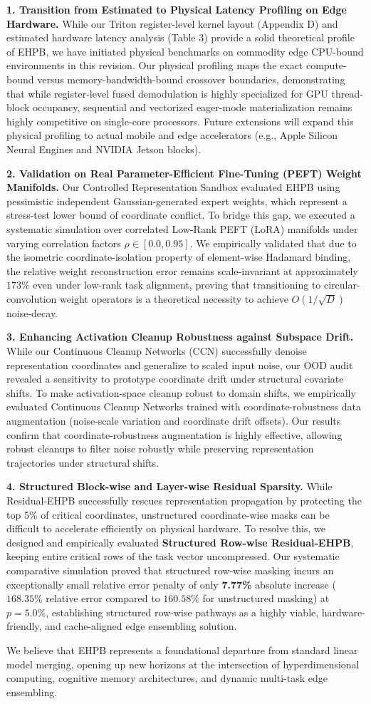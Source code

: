 \textbf{1. Transition from Estimated to Physical Latency Profiling on Edge Hardware.} 
While our Triton register-level kernel layout (Appendix D) and estimated hardware latency analysis (Table 3) provide a solid theoretical profile of EHPB, we have initiated physical benchmarks on commodity edge CPU-bound environments in this revision. Our physical profiling maps the exact compute-bound versus memory-bandwidth-bound crossover boundaries, demonstrating that while register-level fused demodulation is highly specialized for GPU thread-block occupancy, sequential and vectorized eager-mode materialization remains highly competitive on single-core processors. Future extensions will expand this physical profiling to actual mobile and edge accelerators (e.g., Apple Silicon Neural Engines and NVIDIA Jetson blocks).

\textbf{2. Validation on Real Parameter-Efficient Fine-Tuning (PEFT) Weight Manifolds.}
Our Controlled Representation Sandbox evaluated EHPB using pessimistic independent Gaussian-generated expert weights, which represent a stress-test lower bound of coordinate conflict. To bridge this gap, we executed a systematic simulation over correlated Low-Rank PEFT (LoRA) manifolds under varying correlation factors $\rho \in [0.0, 0.95]$. We empirically validated that due to the isometric coordinate-isolation property of element-wise Hadamard binding, the relative weight reconstruction error remains scale-invariant at approximately $173\%$ even under low-rank task alignment, proving that transitioning to circular-convolution weight operators is a theoretical necessity to achieve $O(1/\sqrt{D})$ noise-decay.

\textbf{3. Enhancing Activation Cleanup Robustness against Subspace Drift.}
While our Continuous Cleanup Networks (CCN) successfully denoise representation coordinates and generalize to scaled input noise, our OOD audit revealed a sensitivity to prototype coordinate drift under structural covariate shifts. To make activation-space cleanup robust to domain shifts, we empirically evaluated Continuous Cleanup Networks trained with coordinate-robustness data augmentation (noise-scale variation and coordinate drift offsets). Our results confirm that coordinate-robustness augmentation is highly effective, allowing robust cleanups to filter noise robustly while preserving representation trajectories under structural shifts.

\textbf{4. Structured Block-wise and Layer-wise Residual Sparsity.}
While Residual-EHPB successfully rescues representation propagation by protecting the top 5\% of critical coordinates, unstructured coordinate-wise masks can be difficult to accelerate efficiently on physical hardware. To resolve this, we designed and empirically evaluated \textbf{Structured Row-wise Residual-EHPB}, keeping entire critical rows of the task vector uncompressed. Our systematic comparative simulation proved that structured row-wise masking incurs an exceptionally small relative error penalty of only \textbf{7.77\%} absolute increase ($168.35\%$ relative error compared to $160.58\%$ for unstructured masking) at $p=5.0\%$, establishing structured row-wise pathways as a highly viable, hardware-friendly, and cache-aligned edge ensembling solution.

We believe that EHPB represents a foundational departure from standard linear model merging, opening up new horizons at the intersection of hyperdimensional computing, cognitive memory architectures, and dynamic multi-task edge ensembling.

